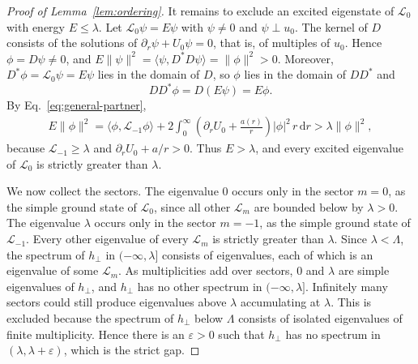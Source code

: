 \documentclass[11pt,a4paper]{article}
\theoremstyle{remark}
\theoremstyle{plain}
\newcommand{\ip}[2]{\langle #1,#2\rangle}
\begin{document}
\begin{proof}[Proof of Lemma~\ref{lem:ordering}]
It remains to exclude an excited eigenstate of $\mathcal L_0$ with
energy $E\le\lambda$. Let $\mathcal L_0\psi=E\psi$ with $\psi\ne0$ and
$\psi\perp u_0$. The kernel of $D$ consists of the solutions of
$\partial_r\psi+U_0\psi=0$, that is, of multiples of $u_0$. Hence
$\phi=D\psi\ne0$, and $E\|\psi\|^2=\ip{\psi}{D^*D\psi}=\|\phi\|^2>0$.
Moreover, $D^*\phi=\mathcal L_0\psi=E\psi$ lies in the domain of $D$, so
$\phi$ lies in the domain of $DD^*$ and
\begin{equation*}
 DD^*\phi=D(E\psi)=E\phi .
\end{equation*}
By Eq.~\eqref{eq:general-partner},
\begin{align*}
 E\|\phi\|^2=\ip{\phi}{\mathcal L_{-1}\phi}
   +2\int_0^\infty\left(\partial_rU_0+\frac {a(r)}{r}\right)|\phi|^2\,r\,\mathrm{d}r
   >\lambda\|\phi\|^2,
\end{align*}
because $\mathcal L_{-1}\ge\lambda$ and $\partial_rU_0+a/r>0$. Thus
$E>\lambda$, and every excited eigenvalue of $\mathcal L_0$ is strictly
greater than $\lambda$.

We now collect the sectors. The eigenvalue $0$ occurs only in the
sector $m=0$, as the simple ground state of $\mathcal L_0$, since all
other $\mathcal L_m$ are bounded below by $\lambda>0$. The eigenvalue
$\lambda$ occurs only in the sector $m=-1$, as the simple ground state
of $\mathcal L_{-1}$. Every other eigenvalue of every $\mathcal L_m$ is
strictly greater than $\lambda$. Since $\lambda<\Lambda$, the
spectrum of $h_\perp$ in $(-\infty,\lambda]$ consists of eigenvalues,
each of which is an eigenvalue of some $\mathcal L_m$. As multiplicities
add over sectors, $0$ and $\lambda$ are simple eigenvalues of
$h_\perp$, and $h_\perp$ has no other spectrum in
$(-\infty,\lambda]$. Infinitely many sectors could still produce
eigenvalues above $\lambda$ accumulating at $\lambda$. This is excluded
because the spectrum of $h_\perp$ below $\Lambda$ consists of isolated
eigenvalues of finite multiplicity. Hence there is an $\varepsilon>0$ such
that $h_\perp$ has no spectrum in $(\lambda,\lambda+\varepsilon)$, which is
the strict gap.
\end{proof}
\end{document}
